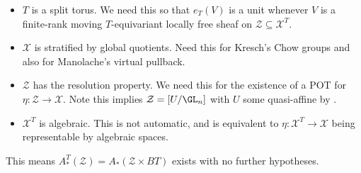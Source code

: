 \documentclass[12pt,dvipsnames]{amsart}
\begin{document}
\noindent
\begin{itemize}
  \item \(T\) is a split torus. We need this so that \(e_T(V)\) is a unit whenever \(V\) is a finite-rank moving \(T\)-equivariant locally free sheaf on \(\mathcal Z\subseteq \mathcal X^T\).
  \item \(\mathcal X\) is stratified by global quotients. Need this for Kresch's Chow groups and also for Manolache's virtual pullback.
  \item \(\mathcal Z\) has the resolution property. We need this for the existence of a POT for \(\eta:\mathcal Z\to \mathcal X\). Note this implies \(\mathcal Z = [U/\GL_n]\) with \(U\) some quasi-affine by \cite{totaro_ResolutionPropertySchemes2004}.
  \item \(\mathcal X^T\) is algebraic. This is not automatic, and is equivalent to \(\eta:\mathcal X^T\to \mathcal X\) being representable by algebraic spaces.
\end{itemize}

This means \(A^T_*(\mathcal Z) = A_*(\mathcal Z\times BT)\) exists with no further hypotheses.
\end{document}
